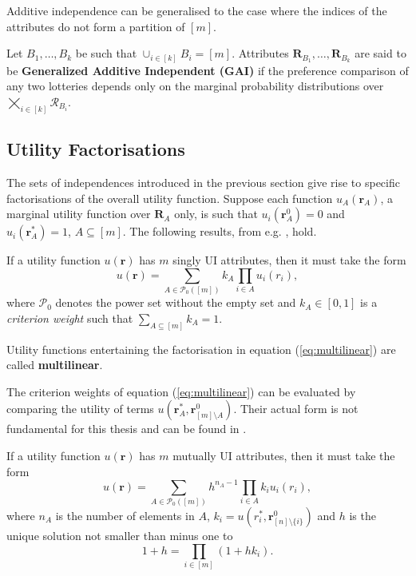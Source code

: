 Additive independence can be generalised to the case where the indices of the attributes do not form a partition of $[m]$. 
\begin{definition}
\label{def:GAI}
Let $B_1,\dots,B_k$ be such that $\cup_{i\in[k]}B_i=[m]$. Attributes $\bm{R}_{B_1},\dots, \bm{R}_{B_k}$ are said to be \textbf{Generalized Additive Independent (GAI)} if  the preference comparison of any two lotteries depends only on the marginal probability distributions over $\bigtimes_{i\in[k]} \bm{\mathcal{R}}_{B_i}$.
\end{definition}

\subsection{Utility Factorisations}
The sets of independences introduced in the previous section give rise to specific factorisations of the overall utility function. Suppose each function $u_A(\bm{r}_A)$, a marginal utility function over $\bm{R}_A$ only, is such that $u_i(\bm{r}_A^0)=0$ and $u_i(\bm{r}_A^*)=1$, $A\subseteq [m]$. The following results, from e.g. \citet{Keeney1993a}, hold.

\begin{proposition}
If a utility function $u(\bm{r})$ has $m$ singly UI attributes, then it must take the form 
\begin{equation}
\label{eq:multilinear}
u(\bm{r})=\sum_{A\in\mathcal{P}_0([m])}k_A\prod_{i\in A} u_i(r_i),
\end{equation}
where $\mathcal{P}_0$ denotes the power set without the empty set and $k_A\in [0,1]$ is a \textit{criterion weight} \citep{Keeney1993a} such that $\sum_{A\subseteq[m]}k_A=1$.
\end{proposition} 

\begin{definition}
\label{def:multilinear}
Utility functions entertaining the factorisation in equation (\ref{eq:multilinear}) are called \textbf{multilinear}.
\end{definition}

The criterion weights of equation (\ref{eq:multilinear}) can be evaluated by comparing the utility of terms $u(\bm{r}_A^*,\bm{r}_{[m]\setminus A}^0)$. Their actual form is not fundamental for this thesis and can be found in \citet{Keeney1993a}. 

\begin{proposition}
\label{prop:multiplicative}
If a utility function $u(\bm{r})$ has $m$ mutually UI attributes, then it must take the form
\begin{equation}
\label{eq:multiplicative}
u(\bm{r})=\sum_{A\in\mathcal{P}_0([m])}h^{n_A-1}\prod_{i\in A}k_iu_i(r_i),
\end{equation}
where $n_A$ is the number of elements in $A$, $k_i=u(r_i^*,\bm{r}_{[n]\setminus \{i\}}^0)$ and $h$ is the unique solution not smaller than minus one to
\begin{equation}
\label{eq:h}
1+h=\prod_{i\in[m]}(1+hk_i).
\end{equation}
\end{proposition}

